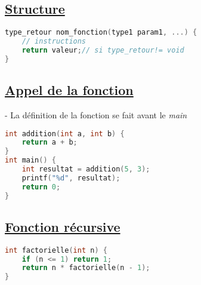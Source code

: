 \documentclass[a3paper,12pt]{article}
\begin{document}
\begin{minipage}[t]{0.5\textwidth}
\begin{tcolorbox}[title=Fonctions, fonttitle=\large, top=10pt, bottom=6.8pt, boxsep=1pt, colback=white,
  colframe=orchidpink, 
  colbacktitle=orchidpink,
  coltitle=white,]
  \vspace{-0.25em}
\subsection*{{\small \underline{Structure}}}
\vspace{-0.5em}
\begin{lstlisting}[language=C, basicstyle=\normalsize , aboveskip=0pt, belowskip=0pt]
type_retour nom_fonction(type1 param1, ...) {
    // instructions
    return valeur;// si type_retour!= void
}
\end{lstlisting}
\vspace{-0.75em}
\subsection*{{\small \underline{Appel de la fonction}}}
- La définition de la fonction se fait avant le \textit{main}
\begin{lstlisting}[language=C, basicstyle=\normalsize , aboveskip=5pt, belowskip=0pt]
int addition(int a, int b) {
    return a + b;
}
int main() {
    int resultat = addition(5, 3);
    printf("%d", resultat);
    return 0;
}
\end{lstlisting}
\vspace{-1.15em}
\subsection*{{\small \underline{Fonction récursive}}}
\begin{lstlisting}[language=C, basicstyle=\normalsize , aboveskip=0pt, belowskip=0pt]
int factorielle(int n) {
    if (n <= 1) return 1;
    return n * factorielle(n - 1);
}
\end{lstlisting}
\end{tcolorbox}
\end{minipage}
\hfill
\end{document}
